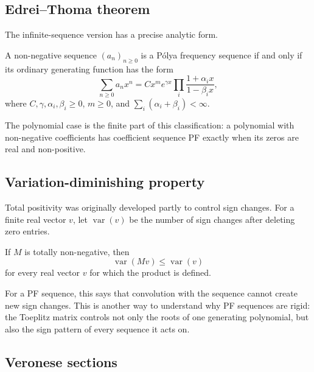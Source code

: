 \subsection[edreiThomaTheorem]{Edrei--Thoma theorem}

The infinite-sequence version has a precise analytic form.

\begin{theorem}
A non-negative sequence \((a_n)_{n\geq 0}\) is a Pólya frequency sequence if
and only if its ordinary generating function has the form
\[
  \sum_{n\geq 0} a_n x^n
  =
  Cx^m e^{\gamma x}
  \prod_i \frac{1+\alpha_i x}{1-\beta_i x},
\]
where \(C,\gamma,\alpha_i,\beta_i\geq 0\), \(m\geq 0\), and
\(\sum_i(\alpha_i+\beta_i)<\infty\).
\end{theorem}

The polynomial case is the finite part of this classification: a polynomial
with non-negative coefficients has coefficient sequence PF exactly when its
zeros are real and non-positive.

\subsection[variationDiminishing]{Variation-diminishing property}

Total positivity was originally developed partly to control sign changes.
For a finite real vector \(v\), let \(\operatorname{var}(v)\) be the number
of sign changes after deleting zero entries.

\begin{theorem}
\label{variationDiminishingProperty}
If \(M\) is totally non-negative, then
\[
  \operatorname{var}(Mv)\leq \operatorname{var}(v)
\]
for every real vector \(v\) for which the product is defined.
\end{theorem}

For a PF sequence, this says that convolution with the sequence cannot create
new sign changes.  This is another way to understand why PF sequences are
rigid: the Toeplitz matrix controls not only the roots of one generating
polynomial, but also the sign pattern of every sequence it acts on.

\subsection[veroneseSectionsPF]{Veronese sections}

